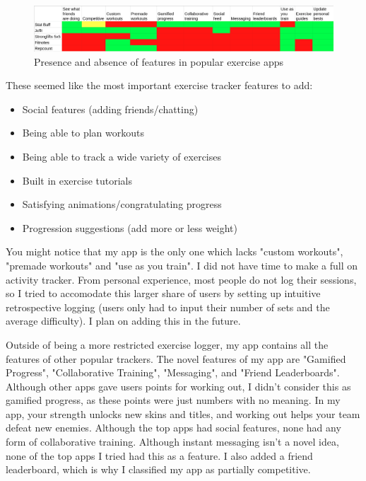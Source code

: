 \documentclass{l4proj}
\begin{document}
\begin{figure}[H]
    \centering
    \includegraphics[width=1.0\linewidth]{exercise_comparisons.png}    
    \caption{
      Presence and absence of features in popular exercise apps
    }
    \label{fig:exercises} 
\end{figure}



These seemed like the most important exercise tracker features to add:
\begin{itemize}    
    \item
      Social features (adding friends/chatting)
    \item
      Being able to plan workouts
    \item
      Being able to track a wide variety of exercises
    \item 
      Built in exercise tutorials
    \item
      Satisfying animations/congratulating progress
    \item
      Progression suggestions (add more or less weight)
\end{itemize}
You might notice that my app is the only one which lacks "custom workouts", "premade workouts" and "use as you train". I did not have time to make a full on activity tracker. From personal experience, most people do not log their sessions, so I tried to accomodate this larger share of users by setting up intuitive retrospective logging (users only had to input their number of sets and the average difficulty). I plan on adding this in the future. 

Outside of being a more restricted exercise logger, my app contains all the features of other popular trackers. The novel features of my app are "Gamified Progress", "Collaborative Training", "Messaging", and "Friend Leaderboards". Although other apps gave users points for working out, I didn't consider this as gamified progress, as these points were just numbers with no meaning. In my app, your strength unlocks new skins and titles, and working out helps your team defeat new enemies. Although the top apps had social features, none had any form of collaborative training. Although instant messaging isn't a novel idea, none of the top apps I tried had this as a feature. I also added a friend leaderboard, which is why I classified my app as partially competitive.
\end{document}
